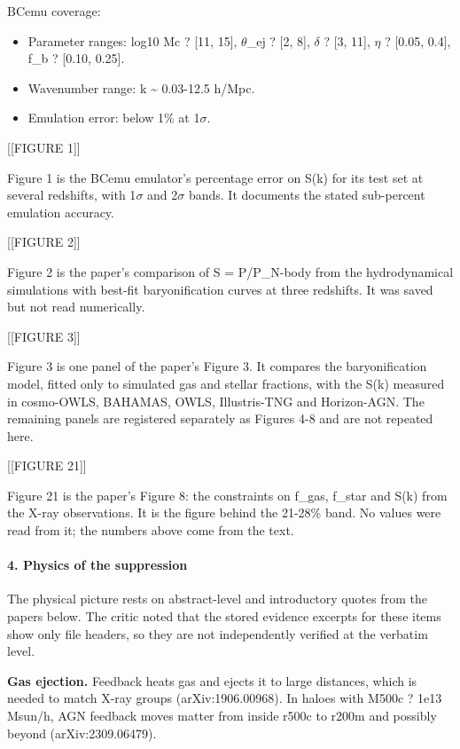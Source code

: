 \documentclass[11pt,a4paper]{article}
\begin{document}
BCemu coverage:

\begin{itemize}
  \item Parameter ranges: log10 Mc ? [11, 15], $\theta$\_ej ? [2, 8], $\delta$ ? [3, 11], $\eta$ ? [0.05, 0.4], f\_b ? [0.10, 0.25].
  \item Wavenumber range: k \textasciitilde{} 0.03-12.5 h/Mpc.
  \item Emulation error: below 1\% at 1$\sigma$.
\end{itemize}
[[FIGURE 1]]

Figure 1 is the BCemu emulator's percentage error on S(k) for its test set at several redshifts, with 1$\sigma$ and 2$\sigma$ bands. It documents the stated sub-percent emulation accuracy.

[[FIGURE 2]]

Figure 2 is the paper's comparison of S = P/P\_N-body from the hydrodynamical simulations with best-fit baryonification curves at three redshifts. It was saved but not read numerically.

[[FIGURE 3]]

Figure 3 is one panel of the paper's Figure 3. It compares the baryonification model, fitted only to simulated gas and stellar fractions, with the S(k) measured in cosmo-OWLS, BAHAMAS, OWLS, Illustris-TNG and Horizon-AGN. The remaining panels are registered separately as Figures 4-8 and are not repeated here.

[[FIGURE 21]]

Figure 21 is the paper's Figure 8: the constraints on f\_gas, f\_star and S(k) from the X-ray observations. It is the figure behind the 21-28\% band. No values were read from it; the numbers above come from the text.

\paragraph{4. Physics of the suppression}
The physical picture rests on abstract-level and introductory quotes from the papers below. The critic noted that the stored evidence excerpts for these items show only file headers, so they are not independently verified at the verbatim level.

\textbf{Gas ejection.} Feedback heats gas and ejects it to large distances, which is needed to match X-ray groups (arXiv:1906.00968). In haloes with M500c ? 1e13 Msun/h, AGN feedback moves matter from inside r500c to r200m and possibly beyond (arXiv:2309.06479).
\end{document}
